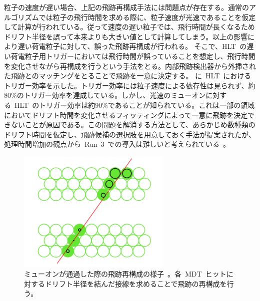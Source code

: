 粒子の速度が遅い場合、上記の飛跡再構成手法には問題点が存在する。通常のアルゴリズムでは粒子の飛行時間を求める際に、粒子速度が光速であることを仮定して計算が行われている。従って速度の遅い粒子では、飛行時間が長くなるためドリフト半径を誤って本来よりも大きい値として計算してしまう。以上の影響により遅い荷電粒子に対して、誤った飛跡再構成が行われる。
そこで、HLT~の遅い荷電粒子用トリガーにおいては飛行時間が誤っていることを想定し、飛行時間を変化させながら再構成を行うという手法をとる。内部飛跡検出器から外挿された飛跡とのマッチングをとることで飛跡を一意に決定する。
に~HLT~におけるトリガー効率を示した。トリガー効率には粒子速度による依存性は見られず、約$80\%$のトリガー効率を達成している。しかし、光速のミューオンに対する~HLT~のトリガー効率は約$90\%$であることが知られている。これは一部の領域においてドリフト時間を変化させるフィッティングによって一意に飛跡を決定できないことが原因である。この問題を解消する方法として、あらかじめ数種類のドリフト時間を仮定し、飛跡候補の選択肢を用意しておく手法が提案されたが、処理時間増加の観点から~Run~3~での導入は難しいと考えられている~\cite{MT:01}。

\begin{figure}[H]
        \centering   
        \includegraphics[width=0.65\textwidth,page=2]{img/pdf3/mdt.png}
        \caption[ミューオンが通過した際の飛跡再構成の様子]{ミューオンが通過した際の飛跡再構成の様子~\cite{MT:01}。各~MDT~ヒットに対するドリフト半径を結んだ接線を求めることで飛跡の再構成を行う。}
        \label{fig:mdt}
\end{figure}

